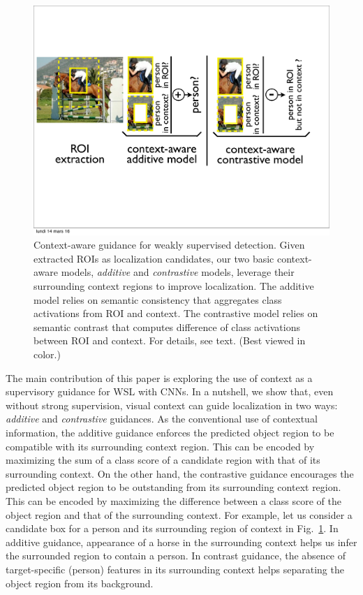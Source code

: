\begin{figure}[t] 
\includegraphics[width=\textwidth, trim={2mm 6.0cm 2mm 3cm},
clip]{eccv16_figures/overview} 
\vspace{-6ex} 
\caption[Context-aware guidance for weakly supervised detection]{Context-aware guidance for weakly supervised detection.
Given extracted ROIs as localization candidates, our two basic context-aware models, {\em additive} and {\em contrastive} models, leverage their surrounding context regions to improve localization. The additive model relies on semantic consistency that aggregates  class activations from ROI and context. The contrastive model relies on semantic contrast that computes  difference of class activations between ROI and context. For details, see text. (Best viewed in color.)} 
\label{fig:intro} 
\end{figure}

The main contribution of this paper is exploring the use of context as a
supervisory guidance for WSL with CNNs. In a nutshell, we show that, even without strong
supervision, visual context can guide localization in two ways: {\it additive
} and {\it contrastive} guidances.  As the conventional use of contextual
information, the additive guidance enforces the predicted object region to be
compatible with its surrounding context region. This can be encoded by
maximizing the sum of a class score of a candidate region with that of its
surrounding context.
On the other hand, the contrastive guidance encourages the
predicted object region to be outstanding from its surrounding context region.
This can be encoded by maximizing the difference between a class score of the
object region and that of the surrounding context. %
For example, let us consider a candidate box for a person and its surrounding
region of context in Fig.~\ref{fig:intro}. In additive guidance,
appearance of a horse in the surrounding context helps us infer the
surrounded region to contain a person. In contrast guidance, the absence of
target-specific (person) features in its surrounding context helps 
separating the object region from its background.

